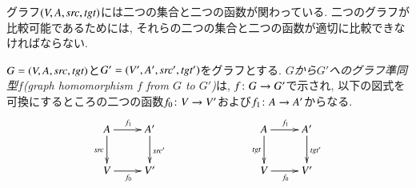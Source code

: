 グラフ$(V,A,\operatorname{\mathit{src}},\operatorname{\mathit{tgt}})$には二つの集合と二つの函数が関わっている. 二つのグラフが比較可能であるためには, それらの二つの集合と二つの函数が適切に比較できなければならない.

\begin{definition}\label{def:graph homomorphism}


$G=(V,A,\operatorname{\mathit{src}},\operatorname{\mathit{tgt}})$と$G'=(V',A',\operatorname{\mathit{src}}',\operatorname{\mathit{tgt}}')$をグラフとする. \emph{$G$から$G'$へのグラフ準同型$f$(graph homomorphism $f$ from $G$ to $G'$)}は, $f\colon G\rightarrow G'$で示され, 以下の図式を可換にするところの二つの函数$f_0\colon V\rightarrow V'$および$f_1\colon A\rightarrow A'$からなる.
\begin{align}\label{dia:graph hom}
\xymatrix{A\ar[r]^{f_1}\ar[d]_{\src}&A'\ar[d]^{\src'}\\V\ar[r]_{f_0}&V'
}\hspace{1in}
\xymatrix{A\ar[r]^{f_1}\ar[d]_{\tgt}&A'\ar[d]^{\tgt'}\\V\ar[r]_{f_0}&V'
}
\end{align}


\end{definition}


